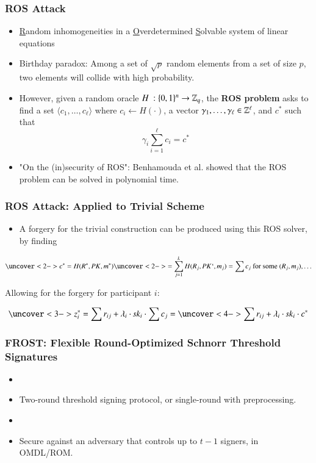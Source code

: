 \documentclass[hyperref={pdfpagelabels=true},table,dvipsnames,14pt,aspectratio=169]{beamer}
\begin{document}
\begin{frame}
  \frametitle{ROS Attack}

  \begin{itemize}
    \item<1-> \underline{R}andom inhomogeneities in a \underline{O}verdetermined \underline{S}olvable system of linear equations
    \item<2-> Birthday paradox: Among a set of $\sqrt{p}$ random elements from a set of size $p$, two elements will collide with high probability. 
    \item<3-> However, given a random oracle $H\ : \{0,1 \}^n \rightarrow \mathbb{Z}_q$, 
	    the \textbf{ROS problem} asks to find a set $\langle c_1, \ldots, c_\ell \rangle$ where $c_i \gets H(\cdot)$, 
	    a vector $\gamma_1, \ldots, \gamma_\ell \in \mathbb{Z}^\ell$, and $c^*$ such that 
	    \[  \gamma_i \sum_{i=1}^\ell c_i = c^*  \]

    \item<4-> "On the (in)security of ROS": Benhamouda et al. showed that the ROS problem can be solved in polynomial time. 
  \end{itemize}
\end{frame}


\begin{frame}
  \frametitle{ROS Attack: Applied to Trivial Scheme}

  \begin{itemize}
    \item<1-> A forgery for the trivial construction can be produced using this ROS solver, by finding 
  \end{itemize}
	\[ \uncover<2-> { c^*= H(R^*, \pk, m^*) \uncover<2->{ = \sum_{j=1}^{k} H(R_j, \pk`, m_j)  =
	\sum c_j  \text{ for some } (R_j, m_j), \dots } } \]

	 { Allowing for the forgery for participant $i$:}

	\[ \uncover<3-> {z_i^* = \sum r_{ij} + \lambda_i \cdot \sk_i \cdot \sum c_j} = \uncover<4->
	{ \sum r_{ij} + \lambda_i \cdot \sk_i \cdot c^*} \]
\end{frame}

\begin{frame}
  \frametitle{FROST: Flexible Round-Optimized Schnorr Threshold Signatures}

  \begin{itemize}
    \item[]
    \item<1-> Two-round threshold signing protocol, or single-round with preprocessing.
    \item[]
    \item<2-> Secure against an adversary that controls up to $t-1$ signers, in OMDL/ROM.
  \end{itemize}
\end{frame}
\end{document}
